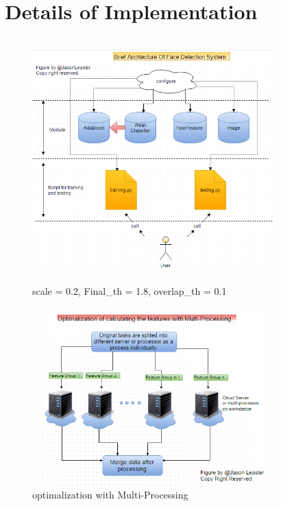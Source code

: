 \documentclass[a4paper, 11pt]{article} %
\begin{document}
\clearpage
\section{Details of Implementation}
    \begin{figure}[H]
        \centering
        \includegraphics[height = 3.7in, width = 3.7in ]{../figure/architecture.png}
        \caption{scale = 0.2, Final\_th = 1.8, overlap\_th = 0.1}
    \end{figure}

    \begin{figure}[H]
        \centering
        \includegraphics[height = 2.7in, width = 3.7in ]{../figure/concurrent.png}
        \caption{optimalization with Multi-Processing}
    \end{figure}
\end{document}
